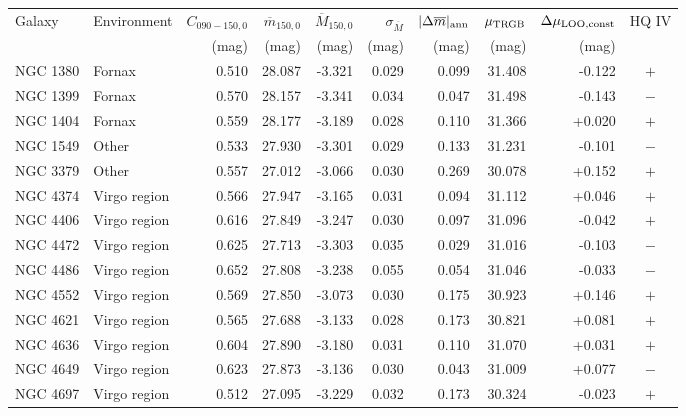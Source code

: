 \begin{tabular}{llrrrrrrrc}
\toprule
Galaxy & Environment & $C_{090-150,0}$ & $\overline m_{150,0}$ &
$\overline M_{150,0}$ & $\sigma_{\overline M}$ &
$|\Delta\overline m|_{\rm ann}$ & $\mu_{\rm TRGB}$ &
$\Delta\mu_{\rm LOO,const}$ & HQ IV \\
 & & (mag) & (mag) & (mag) & (mag) & (mag) & (mag) & (mag) & \\
\midrule
NGC 1380 & Fornax & 0.510 & 28.087 & -3.321 & 0.029 & 0.099 & 31.408 & -0.122 & $+$ \\
NGC 1399 & Fornax & 0.570 & 28.157 & -3.341 & 0.034 & 0.047 & 31.498 & -0.143 & $-$ \\
NGC 1404 & Fornax & 0.559 & 28.177 & -3.189 & 0.028 & 0.110 & 31.366 & +0.020 & $+$ \\
NGC 1549 & Other & 0.533 & 27.930 & -3.301 & 0.029 & 0.133 & 31.231 & -0.101 & $-$ \\
NGC 3379 & Other & 0.557 & 27.012 & -3.066 & 0.030 & 0.269 & 30.078 & +0.152 & $+$ \\
NGC 4374 & Virgo region & 0.566 & 27.947 & -3.165 & 0.031 & 0.094 & 31.112 & +0.046 & $+$ \\
NGC 4406 & Virgo region & 0.616 & 27.849 & -3.247 & 0.030 & 0.097 & 31.096 & -0.042 & $+$ \\
NGC 4472 & Virgo region & 0.625 & 27.713 & -3.303 & 0.035 & 0.029 & 31.016 & -0.103 & $-$ \\
NGC 4486 & Virgo region & 0.652 & 27.808 & -3.238 & 0.055 & 0.054 & 31.046 & -0.033 & $-$ \\
NGC 4552 & Virgo region & 0.569 & 27.850 & -3.073 & 0.030 & 0.175 & 30.923 & +0.146 & $+$ \\
NGC 4621 & Virgo region & 0.565 & 27.688 & -3.133 & 0.028 & 0.173 & 30.821 & +0.081 & $+$ \\
NGC 4636 & Virgo region & 0.604 & 27.890 & -3.180 & 0.031 & 0.110 & 31.070 & +0.031 & $+$ \\
NGC 4649 & Virgo region & 0.623 & 27.873 & -3.136 & 0.030 & 0.043 & 31.009 & +0.077 & $-$ \\
NGC 4697 & Virgo region & 0.512 & 27.095 & -3.229 & 0.032 & 0.173 & 30.324 & -0.023 & $+$ \\
\bottomrule
\end{tabular}

